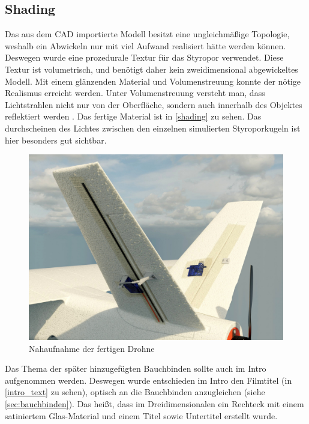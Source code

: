 \subsection{Shading}

Das aus dem CAD importierte Modell besitzt eine ungleichmäßige Topologie, weshalb ein Abwickeln nur mit viel Aufwand realisiert hätte werden können. Deswegen wurde eine prozedurale Textur für das Styropor verwendet. Diese Textur ist volumetrisch, und benötigt daher kein zweidimensional abgewickeltes Modell. Mit einem glänzenden Material und Volumenstreuung konnte der nötige Realismus erreicht werden. Unter Volumenstreuung versteht man, dass Lichtstrahlen nicht nur von der Oberfläche, sondern auch innerhalb des Objektes reflektiert werden . Das fertige Material ist in \autoref{shading} zu sehen. Das durchscheinen des Lichtes zwischen den einzelnen simulierten Styroporkugeln ist hier besonders gut sichtbar.

\begin{figure}[H]
\begin{center}
\includegraphics[width=\textwidth]{gfx/prod/plane/shading.jpg}
\caption{Nahaufnahme der fertigen Drohne}
\label{shading}
\end{center}
\end{figure}

Das Thema der später hinzugefügten Bauchbinden sollte auch im Intro aufgenommen werden. Deswegen wurde entschieden im Intro den Filmtitel (in \autoref{intro_text} zu sehen), optisch an die Bauchbinden anzugleichen (siehe \autoref{sec:bauchbinden}). Das heißt, dass im Dreidimensionalen ein Rechteck mit einem satiniertem Glas-Material und einem Titel sowie Untertitel erstellt wurde.

